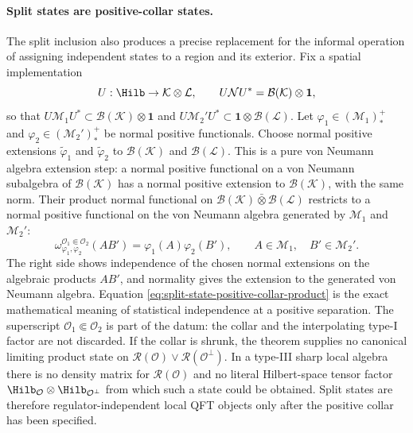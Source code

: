 \paragraph{Split states are positive-collar states.}
The split inclusion also produces a precise replacement for the informal
operation of assigning independent states to a region and its exterior.  Fix a
spatial implementation
\[
  U:\Hilb\to\mathcal K\otimes\mathcal L,
  \qquad
  U\mathcal N U^*=\mathcal B(\mathcal K)\otimes\mathbf 1 ,
\]
so that \(U\mathcal M_1U^*\subset\mathcal B(\mathcal K)\otimes\mathbf 1\)
and \(U\mathcal M_2'U^*\subset\mathbf 1\otimes\mathcal B(\mathcal L)\).  Let
\(\varphi_1\in(\mathcal M_1)_*^+\) and
\(\varphi_2\in(\mathcal M_2')_*^+\) be normal positive functionals.  Choose
normal positive extensions \(\widetilde\varphi_1\) and
\(\widetilde\varphi_2\) to \(\mathcal B(\mathcal K)\) and
\(\mathcal B(\mathcal L)\).  This is a pure von Neumann algebra extension
step: a normal positive functional on a von Neumann subalgebra of
\(\mathcal B(\mathcal K)\) has a normal positive extension to
\(\mathcal B(\mathcal K)\), with the same norm.  Their product normal
functional on
\(\mathcal B(\mathcal K)\bar\otimes\mathcal B(\mathcal L)\) restricts to a
normal positive functional on the von Neumann algebra generated by
\(\mathcal M_1\) and \(\mathcal M_2'\):
\begin{equation}
  \omega_{\varphi_1,\varphi_2}^{\mathcal O_1\Subset\mathcal O_2}(AB')
  =
  \varphi_1(A)\varphi_2(B'),
  \qquad
  A\in\mathcal M_1,\quad B'\in\mathcal M_2'.
  \label{eq:split-state-positive-collar-product}
\end{equation}
The right side shows independence of the chosen normal extensions on the
algebraic products \(AB'\), and normality gives the extension to the generated
von Neumann algebra.  Equation
\eqref{eq:split-state-positive-collar-product} is the exact mathematical
meaning of statistical independence at a positive separation.  The superscript
\(\mathcal O_1\Subset\mathcal O_2\) is part of the datum: the collar and the
interpolating type-I factor are not discarded.  If the collar is shrunk, the
theorem supplies no canonical limiting product state on
\(\mathcal R(\mathcal O)\vee\mathcal R(\mathcal O^\perp)\).  In a type-III
sharp local algebra there is no density matrix for \(\mathcal R(\mathcal O)\)
and no literal Hilbert-space tensor factor
\(\Hilb_{\mathcal O}\otimes\Hilb_{\mathcal O^\perp}\) from which such a state
could be obtained.  Split states are therefore regulator-independent local
QFT objects only after the positive collar has been specified.

